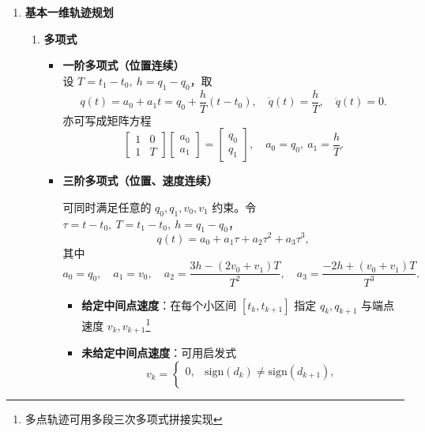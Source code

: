 \documentclass[../main.tex]{subfiles}
\begin{document}
\begin{enumerate}
    \item \textbf{基本一维轨迹规划}\label{sec:basic-1d}
        \begin{enumerate}
            \item \textbf{多项式}\label{method:poly}
                \begin{itemize}
                    \item \textbf{一阶多项式（位置连续）}\\
                    {\small\kaishu
                    设 $T=t_1-t_0,\ h=q_1-q_0$，取
                    \[
                    q(t)=a_0+a_1 t = q_0+\frac{h}{T}(t-t_0),\quad
                    \dot q(t)=\frac{h}{T},\quad
                    \ddot q(t)=0 .
                    \]
                    亦可写成矩阵方程
                    \[
                    \begin{bmatrix}1&0\\ 1&T\end{bmatrix}
                    \begin{bmatrix}a_0\\ a_1\end{bmatrix}
                    =\begin{bmatrix}q_0\\ q_1\end{bmatrix},\quad a_0=q_0,\ a_1=\frac{h}{T}.
                    \]
                    }
                    \item \textbf{三阶多项式（位置、速度连续）}\\
                    {\small\kaishu
                    可同时满足任意的 $q_0,q_1,v_0,v_1$ 约束。令 $\tau=t-t_0,\ T=t_1-t_0,\ h=q_1-q_0$，
                    \[
                    q(t)=a_0+a_1\tau+a_2\tau^2+a_3\tau^3,
                    \]
                    其中
                    \[
                    a_0=q_0,\quad a_1=v_0,\quad
                    a_2=\frac{3h-(2v_0+v_1)T}{T^2},\quad
                    a_3=\frac{-2h+(v_0+v_1)T}{T^3}.
                    \]
                    \begin{itemize}
                        \item \textbf{给定中间点速度}：在每个小区间 $[t_k,t_{k+1}]$ 指定 $q_k,q_{k+1}$ 与端点速度 $v_k,v_{k+1}$\footnote{多点轨迹可用多段三次多项式拼接实现}
                        \item \textbf{未给定中间点速度}：可用启发式
                    \[
                    v_k=\begin{cases}
                    0,& \mathrm{sign}(d_k)\neq \mathrm{sign}(d_{k+1}),\\[2pt]

\end{cases}\]
\end{itemize}}
\end{itemize}
\end{enumerate}
\end{enumerate}
\end{document}
